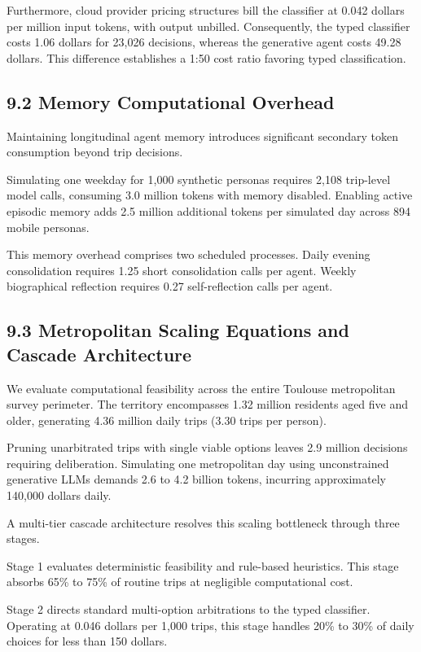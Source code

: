 Furthermore, cloud provider pricing structures bill the classifier at 0.042 dollars per million input tokens, with output unbilled. Consequently, the typed classifier costs 1.06 dollars for 23,026 decisions, whereas the generative agent costs 49.28 dollars. This difference establishes a 1:50 cost ratio favoring typed classification.

\subsection{9.2 Memory Computational Overhead}

Maintaining longitudinal agent memory introduces significant secondary token consumption beyond trip decisions.

Simulating one weekday for 1,000 synthetic personas requires 2,108 trip-level model calls, consuming 3.0 million tokens with memory disabled. Enabling active episodic memory adds 2.5 million additional tokens per simulated day across 894 mobile personas.

This memory overhead comprises two scheduled processes. Daily evening consolidation requires 1.25 short consolidation calls per agent. Weekly biographical reflection requires 0.27 self-reflection calls per agent.

\subsection{9.3 Metropolitan Scaling Equations and Cascade Architecture}

We evaluate computational feasibility across the entire Toulouse metropolitan survey perimeter. The territory encompasses 1.32 million residents aged five and older, generating 4.36 million daily trips (3.30 trips per person).

Pruning unarbitrated trips with single viable options leaves 2.9 million decisions requiring deliberation. Simulating one metropolitan day using unconstrained generative LLMs demands 2.6 to 4.2 billion tokens, incurring approximately 140,000 dollars daily.

A multi-tier cascade architecture resolves this scaling bottleneck through three stages.

Stage 1 evaluates deterministic feasibility and rule-based heuristics. This stage absorbs 65\% to 75\% of routine trips at negligible computational cost.

Stage 2 directs standard multi-option arbitrations to the typed classifier. Operating at 0.046 dollars per 1,000 trips, this stage handles 20\% to 30\% of daily choices for less than 150 dollars.

